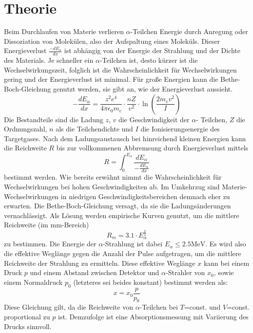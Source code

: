 \section{Theorie}
\label{sec:Theorie}

Beim Durchlaufen von Materie verlieren $\alpha$-Teilchen Energie durch Anregung 
oder Dissoziation von Molekülen, also der Aufspaltung eines Moleküls. Dieser 
Energieverlust $\frac{-dE_{\alpha}}{dx}$ ist abhängig von der Energie der 
Strahlung und der Dichte des Materials. Je schneller ein $\alpha$-Teilchen ist, 
desto kürzer ist die Wechselwirkungszeit, folglich ist die Wahrscheinlichkeit 
für Wechselwirkungen gering und der Energieverlust ist minimal. Für große 
Energien kann die Bethe-Boch-Gleichung genutzt werden, sie gibt an, wie der 
Energieverlust aussieht.
\begin{equation}
    \label{eqn:1}
    -\frac{dE_\alpha}{dx} = \frac{z^2 e^4}{4 \pi \epsilon_0 m_e} \cdot 
                           \frac{n Z}{v^2} \cdot \ln\left(\frac{2 m_e v^2}{I}\right)
\end{equation}
Die Bestandteile sind die Ladung $z$, $v$ die Geschwindigkeit der $\alpha$-
Teilchen, $Z$ die Ordnungszahl, $n$ als die Teilchendichte und $I$ die 
Ionisierungsenergie des Targetgases. Nach dem Ladungsaustausch bei hinreichend
kleinen Energien kann die Reichweite $R$ bis zur vollkommenen Abbremsung durch 
Energieverlust mittels 
\begin{equation}
    \label{eqn:2}
    R = \int_0^{E_\alpha} \frac{dE_{\alpha}}{-\frac{dE_\alpha}{dx}}
\end{equation}
bestimmt werden. Wie bereits erwähnt nimmt die Wahrscheinlichkeit für 
Wechselwirkungen bei hohen Geschwindigkeiten ab. Im Umkehrzug sind Materie-
Wechselwirkungen in niedrigen Geschwindigkeitsbereichen demnach eher zu erwarten.
Die Bethe-Boch-Gleichung versagt, da sie die Ladungsänderungen vernachlässigt.
Als Lösung werden empirische Kurven genutzt, um die mittlere Reichweite (im 
$\unit{\milli\meter}$-Bereich)
\begin{equation}
    \label{eqn:3}
    R_m = 3.1 \cdot E_{\alpha}^{\frac{3}{2}}
\end{equation}
zu bestimmen. Die Energie der $\alpha$-Strahlung ist dabei $E_{\alpha} \leq 
2.5 \unit{\mega\eV}$. Es wird also die effektive Weglänge gegen die Anzahl der 
Pulse aufgetragen, um die mittlere Reichweite der Strahlung zu ermitteln.
Diese effektive Weglänge $x$ kann bei einem Druck $p$ und einem Abstand zwischen 
Detektor und $\alpha$-Strahler von $x_0$, sowie einem Normaldruck $p_0$ (letzteres 
sei beides konstant) bestimmt werden als:
\begin{equation}
    \label{eqn:4}
    x = x_0 \frac{p}{p_0}
\end{equation}
Diese Gleichung gilt, da die Reichweite von $\alpha$-Teilchen bei $T$=const. und 
$V$=const. proportional zu $p$ ist. Demzufolge ist eine Absorptionsmessung mit 
Variierung des Drucks sinnvoll.
\cite{anleitung11}

